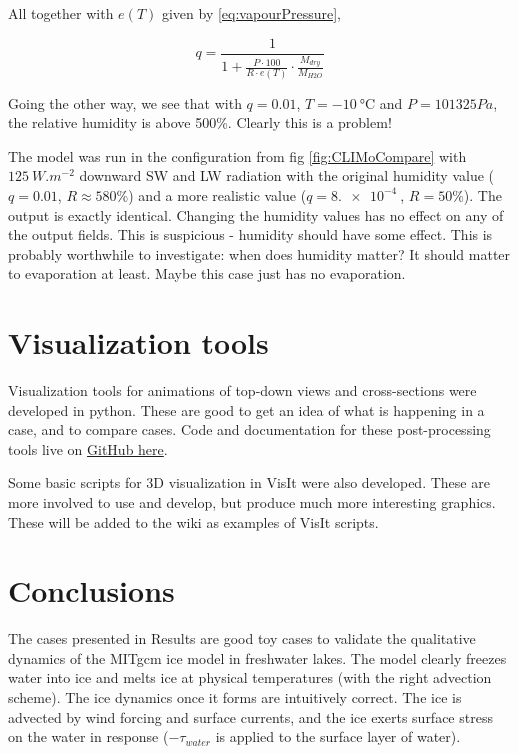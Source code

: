 \documentclass[11pt]{article}
\begin{document}
All together with $e(T)$ given by \ref{eq:vapourPressure},

\begin{equation}
\label{eq:humidityConversion}
q = \frac{1}{1 + \frac{P\cdot 100}{R\cdot e(T)} \cdot \frac{M_{dry}}{M_{H2O}}}
\end{equation}

Going the other way, we see that with $q = 0.01$, $T = \SI{-10}{\celsius}$ and $P = 101325 Pa$, the relative humidity is above 500\%. Clearly this is a problem!

The model was run in the configuration from fig \ref{fig:CLIMoCompare} with $\SI{125}{W.m^{-2}}$ downward SW and LW radiation with the original humidity value ($q = 0.01$, $R \approx 580\%$) and a more realistic value ($q = \SI{8.e-4}{}$, $R = 50\%$). The output is exactly identical. Changing the humidity values has no effect on any of the output fields. This is suspicious - humidity should have some effect. This is probably worthwhile to investigate: when does humidity matter? It should matter to evaporation at least. Maybe this case just has no evaporation.

\section{Visualization tools}
Visualization tools for animations of top-down views and cross-sections were developed in python. These are good to get an idea of what is happening in a case, and to compare cases. Code and documentation for these post-processing tools live on \href{https://github.com/timghill/gcmpy}{GitHub here}.

Some basic scripts for 3D visualization in VisIt were also developed. These are more involved to use and develop, but produce much more interesting graphics. These will be added to the wiki as examples of VisIt scripts.

\section{Conclusions}
The cases presented in Results are good toy cases to validate the qualitative dynamics of the MITgcm ice model in freshwater lakes. The model clearly freezes water into ice and melts ice at physical temperatures (with the right advection scheme). The ice dynamics once it forms are intuitively correct. The ice is advected by wind forcing and surface currents, and the ice exerts surface stress on the water in response ($-\tau_{water}$ is applied to the surface layer of water).
\end{document}

